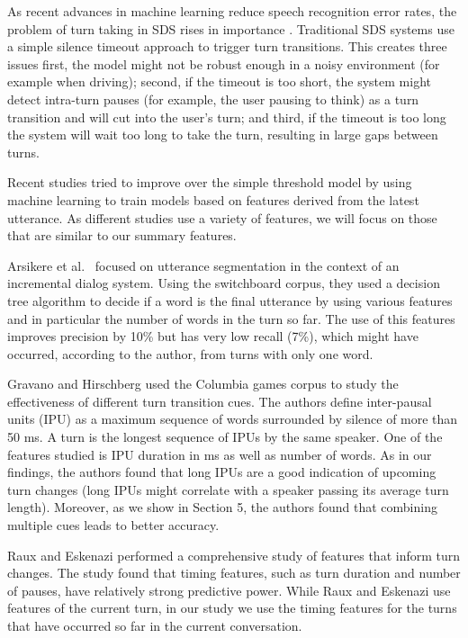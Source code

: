 
As recent advances in machine learning reduce speech recognition error rates, the problem of turn taking in SDS rises in importance \cite{hinton2012deep}. Traditional SDS systems use a simple silence timeout approach to trigger turn transitions. This creates three issues \cite{arsikere2015enhanced} first, the model might not be robust enough
in a noisy environment (for example when driving); second, if the timeout is too short, the system might
detect intra-turn pauses (for example, the user pausing to think) as a turn transition and will cut into the user's turn;
and third, if the timeout is too long the system will wait too long to take the turn, resulting in large gaps between turns.

Recent studies tried to improve over the simple threshold model by using machine learning to train models based on features derived from the latest utterance. As different studies use a variety of features, we will focus on those that are similar to our summary features.

Arsikere et al.~\cite{atterer2008towards} focused on utterance segmentation in the context of an incremental dialog system.
Using the switchboard corpus, they used a decision tree algorithm to decide if a word is the final utterance by using various features and in particular the number of words in the turn so far. The use of this features improves precision by 10\% but has very low recall (7\%), which might have occurred, according to the author, from turns with only one word.

Gravano and Hirschberg \cite{gravano2011turn} used the Columbia games corpus to study the effectiveness of
different turn transition cues. The authors define inter-pausal units (IPU) as a maximum sequence of words surrounded
by silence of more than 50 ms. A turn is the longest sequence of IPUs by the same speaker.
One of the features studied is IPU duration in ms as well as number of words. As in our findings,
the authors found that long IPUs are a good indication of upcoming turn changes (long IPUs might correlate with a speaker passing
its average turn length). Moreover, as we show in Section 5, the authors found that combining multiple cues leads to better accuracy.

Raux and Eskenazi \cite{raux2012optimizing} performed a comprehensive study of features that inform turn changes. The study
found that timing features, such as turn duration and number of pauses, have relatively strong predictive power. While Raux and Eskenazi use features of the current turn, in our study we use the timing features for the turns that have occurred so far in the current conversation.

